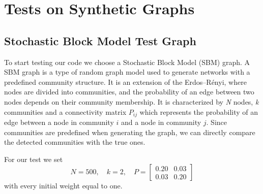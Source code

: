 \section{Tests on Synthetic Graphs}
\label{sec5.2}
\subsection{Stochastic Block Model Test Graph}
To start testing our code we choose a Stochastic Block Model (SBM) graph. A SBM graph is a type of random graph model used to generate networks with a predefined community structure. It is an extension of the Erdos--R\'enyi, where nodes are divided into communities, and the probability of an edge between two nodes depends on their community membership. It is characterized by \textit{N} nodes, \textit{k} communities and a connectivity matrix \textit{$P_{ij}$} which represents the probability of an edge between a node in community $i$ and a node in community $j$.
Since communities are predefined when generating the graph, we can directly compare the detected communities with the true ones.

For our test we set 
\begin{equation*}
    N = 500, \quad k = 2, \quad
    P =
    \begin{bmatrix} 
        0.20 & 0.03 \\
        0.03 & 0.20
    \end{bmatrix}
\end{equation*}
with every initial weight equal to one.

